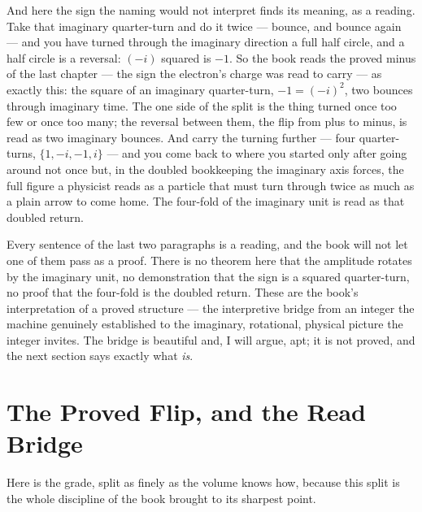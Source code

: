 And here the sign the naming would not interpret finds its meaning, as a reading. Take that imaginary quarter-turn
and do it twice --- bounce, and bounce again --- and you have turned through the imaginary direction a full half
circle, and a half circle is a reversal: $(-i)$ squared is $-1$. So the book reads the proved minus of the last
chapter --- the sign the electron's charge was read to carry --- as exactly this: the square of an imaginary
quarter-turn, $-1 = (-i)^2$, two bounces through imaginary time. The one side of the split is the thing turned once
too few or once too many; the reversal between them, the flip from plus to minus, is read as two imaginary
bounces. And carry the turning further --- four quarter-turns, $\{1, -i, -1, i\}$ --- and you come back to where you
started only after going around not once but, in the doubled bookkeeping the imaginary axis forces, the full
figure a physicist reads as a particle that must turn through twice as much as a plain arrow to come home. The
four-fold of the imaginary unit is read as that doubled return.

Every sentence of the last two paragraphs is a reading, and the book will not let one of them pass as a proof.
There is no theorem here that the amplitude rotates by the imaginary unit, no demonstration that the sign is a
squared quarter-turn, no proof that the four-fold is the doubled return. These are the book's interpretation of a
proved structure --- the interpretive bridge from an integer the machine genuinely established to the imaginary,
rotational, physical picture the integer invites. The bridge is beautiful and, I will argue, apt; it is not
proved, and the next section says exactly what \emph{is}.

\section{The Proved Flip, and the Read Bridge}

Here is the grade, split as finely as the volume knows how, because this split is the whole discipline of the book
brought to its sharpest point.

